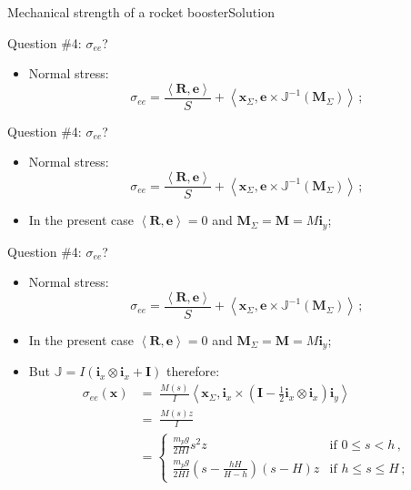 \documentclass{beamer}
\newcommand{\demi}{\frac{1}{2}}
\newcommand{\Id}{{\boldsymbol I}}
\newcommand{\xj}{x}
\newcommand{\yj}{y}
\newcommand{\zj}{z}
\newcommand{\xv}{{\boldsymbol\xj}}
\newcommand{\ej}{e}
\renewcommand{\ij}{i}
\newcommand{\ev}{{\boldsymbol\ej}}
\newcommand{\iv}{{\boldsymbol\ij}}
\newcommand*{\Mstaticj}{J}
\newcommand*{\Mstatic}{{\mathbb\Mstaticj}}
\newcommand*{\stressj}{\sigma}
\newcommand{\Fresj}{R}
\newcommand{\Mresj}{M}
\newcommand{\Fres}{{\boldsymbol\Fresj}}
\newcommand{\Mres}{{\boldsymbol\Mresj}}
\newcommand{\scal}[1]{\left\langle{#1}\right\rangle}
\begin{document}
\begin{frame}{Mechanical strength of a rocket booster}{Solution}

\begin{overprint}

\vskip-20pt
\begin{exampleblock}{Question \#4: $\stressj_{ee}$?}
\begin{itemize}
\item Normal stress:
\begin{displaymath}
\stressj_{ee}=\frac{\scal{\Fres,\ev}}{S}+\scal{\xv_\Sigma,\ev\times\Mstatic^{-1}(\Mres_\Sigma)}\,;
\end{displaymath}
\end{itemize}
\end{exampleblock}

\vskip-20pt
\begin{exampleblock}{Question \#4: $\stressj_{ee}$?}
\begin{itemize}
\item Normal stress:
\begin{displaymath}
\stressj_{ee}=\frac{\scal{\Fres,\ev}}{S}+\scal{\xv_\Sigma,\ev\times\Mstatic^{-1}(\Mres_\Sigma)}\,;
\end{displaymath}
\item In the present case $\scal{\Fres,\ev}=0$ and $\Mres_\Sigma=\Mres=\Mresj\iv_\yj$;
\end{itemize}
\end{exampleblock}

\vskip-20pt
\begin{exampleblock}{Question \#4: $\stressj_{ee}$?}
\begin{itemize}
\item Normal stress:
\begin{displaymath}
\stressj_{ee}=\frac{\scal{\Fres,\ev}}{S}+\scal{\xv_\Sigma,\ev\times\Mstatic^{-1}(\Mres_\Sigma)}\,;
\end{displaymath}
\item In the present case $\scal{\Fres,\ev}=0$ and $\Mres_\Sigma=\Mres=\Mresj\iv_\yj$;
\item But $\Mstatic=I(\iv_\xj\otimes\iv_\xj+\Id)$ therefore:
\begin{displaymath}
\begin{split}
\stressj_{ee}(\xv) &= \scriptstyle\;\frac{\Mresj(s)}{I}\scal{\xv_\Sigma,\iv_\xj\times\left(\Id-\demi\iv_\xj\otimes\iv_\xj\right)\iv_\yj} \\
&=\scriptstyle\; \frac{\Mresj(s)\zj}{I} \\
&=\left\{\begin{array}{ll}
\scriptstyle \frac{m_p g}{2HI}s^2\zj & \scriptstyle\text{if $0\leq s < h$}\,,\\
\scriptstyle \frac{m_p g}{2HI}\left(s-\frac{hH}{H-h}\right)(s-H)\zj & \scriptstyle\text{if $h\leq s \leq H$}\,;
\end{array}\right.
\end{split}
\end{displaymath}
\end{itemize}
\end{exampleblock}


\end{overprint}
\end{frame}
\end{document}
